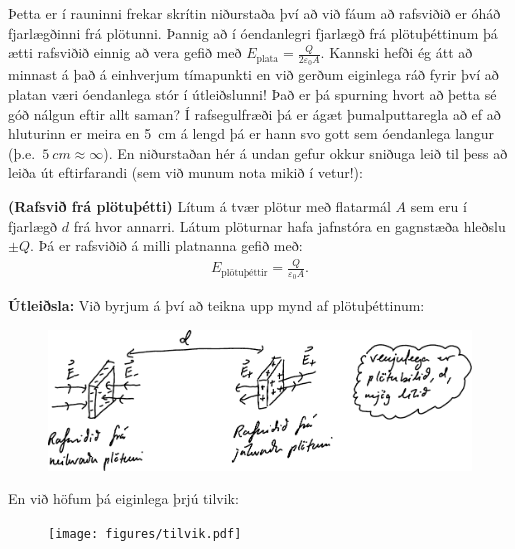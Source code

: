 Þetta er í rauninni frekar skrítin niðurstaða því að við fáum að rafsviðið er óháð fjarlægðinni frá plötunni. Þannig að í óendanlegri fjarlægð frá plötuþéttinum þá ætti rafsviðið einnig að vera gefið með $E_{\text{plata}} = \frac{Q}{2\varepsilon_0 A}$. Kannski hefði ég átt að minnast á það á einhverjum tímapunkti en við gerðum eiginlega ráð fyrir því að platan væri óendanlega stór í útleiðslunni! Það er þá spurning hvort að þetta sé góð nálgun eftir allt saman? Í rafsegulfræði þá er ágæt þumalputtaregla að ef að hluturinn er meira en \SI{5}{cm} á lengd þá er hann svo gott sem óendanlega langur (þ.e.~$\SI{5}{cm} \approx \infty$). En niðurstaðan hér á undan gefur okkur sniðuga leið til þess að leiða út eftirfarandi (sem við munum nota mikið í vetur!):

\newpage

\begin{tcolorbox}
\begin{theorem}
\textbf{(Rafsvið frá plötuþétti)} Lítum á tvær plötur með flatarmál $A$ sem eru í fjarlægð $d$ frá hvor annarri. Látum plöturnar hafa jafnstóra en gagnstæða hleðslu $\pm Q$. Þá er rafsviðið á milli platnanna gefið með:
\begin{align*}
    E_{\text{plötuþéttir}} = \frac{Q}{\varepsilon_0 A}.
\end{align*}
\end{theorem}
\end{tcolorbox}

\textbf{Útleiðsla:} Við byrjum á því að teikna upp mynd af plötuþéttinum:

\begin{figure}[ht!]
    \centering
    \includegraphics{figures/rafsvidid-plata.pdf}
\end{figure}

En við höfum þá eiginlega þrjú tilvik:

\begin{figure}[ht!]
    \centering
    \texttt{[image: figures/tilvik.pdf]}
\end{figure}

